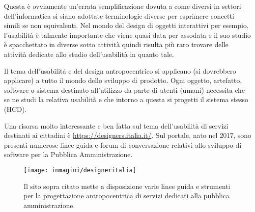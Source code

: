 Questa è ovviamente un'errata semplificazione dovuta a come diversi in settori dell'informatica si siano adottate terminologie diverse per esprimere
concetti simili se non equivalenti. Nel mondo del design di oggetti interattivi per esempio, l'usabilità è talmente importante che viene quasi data
per assodata e il suo studio è spacchettato in diverse sotto attività quindi risulta più raro trovare delle attività dedicate allo studio dell'usabilità
in quanto tale.

Il tema dell'usabilità e del design antropocentrico si applicano (si dovrebbero applicare) a tutto il mondo dello sviluppo di prodotto. Ogni
oggetto, artefatto, software o sistema destinato all'utilizzo da parte di utenti (umani) necessita che se ne studi la relativa usabilità e che intorno
a questa si progetti il sistema stesso (HCD).

Una risorsa molto interessante e ben fatta sul tema dell'usabilità di servizi destinati ai cittadini è \url{https://designers.italia.it/}. Sul portale,
nato nel 2017, sono presenti numerose linee guida e forum di conversazione relativi allo sviluppo di software per la Pubblica Amministrazione. 

\begin{figure}[!h]
	\centering
	\texttt{[image: immagini/designeritalia]}
	\caption{Il sito sopra citato mette a disposizione varie linee guida e strumenti per la progettazione antropocentrica di servizi dedicati
	alla pubblica amministrazione.}
	\label{designersitalia}
\end{figure}
